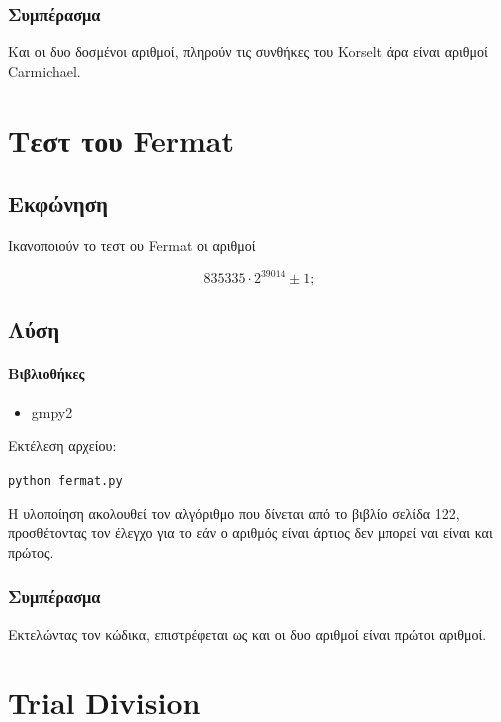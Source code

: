 \documentclass[oneside]{article}
\let\t\texttt
\begin{document}
\subsubsection{Συμπέρασμα}

Και οι δυο δοσμένοι αριθμοί, πληρούν τις συνθήκες του Korselt άρα είναι αριθμοί Carmichael.

\section{Τεστ του Fermat}

\subsection{Εκφώνηση}

Ικανοποιούν το τεστ ου Fermat οι αριθμοί

\[
    835335 \cdot 2^{39014} \pm 1;
\]

\subsection{Λύση} 

\paragraph{Βιβλιοθήκες}

\begin{itemize}
    \item gmpy2
\end{itemize}

Εκτέλεση αρχείου:

\begin{center}
    \t{python fermat.py}
\end{center}

Η υλοποίηση ακολουθεί τον αλγόριθμο που δίνεται από το βιβλίο \cite{draz:2022} σελίδα 122, προσθέτοντας τον έλεγχο για το εάν ο αριθμός είναι άρτιος δεν μπορεί ναι είναι και πρώτος.

\subsubsection{Συμπέρασμα}

Εκτελώντας τον κώδικα, επιστρέφεται ως και οι δυο αριθμοί είναι πρώτοι αριθμοί.

\section{Trial Division}
\end{document}
